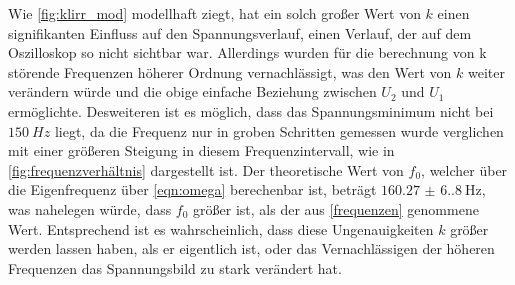     Wie \ref{fig:klirr_mod} modellhaft ziegt, hat ein solch großer Wert von $k$ einen signifikanten Einfluss auf den Spannungsverlauf, einen
    Verlauf, der auf dem Oszilloskop so nicht sichtbar war.
    Allerdings wurden für die berechnung von k störende Frequenzen höherer Ordnung vernachlässigt, was den Wert von $k$ weiter
    verändern würde und die obige einfache Beziehung zwischen $U_2$ und $U_1$ ermöglichte. Desweiteren ist es möglich, dass 
    das Spannungsminimum nicht bei $\qty{150}{Hz}$ liegt, da die Frequenz nur in groben Schritten gemessen wurde verglichen mit einer
    größeren Steigung in diesem Frequenzintervall, wie in \ref{fig:frequenzverhältnis} dargestellt ist. Der theoretische Wert von
    $f_0$, welcher über die Eigenfrequenz über \ref{eqn:omega} berechenbar ist, beträgt $\qty{160.27(6.80)}{\hertz}$, was nahelegen würde,
    dass $f_0$ größer ist, als der aus \ref{frequenzen} genommene Wert. Entsprechend ist es wahrscheinlich, dass diese Ungenauigkeiten $k$ größer
    werden lassen haben, als er eigentlich ist, oder das Vernachlässigen der höheren Frequenzen das Spannungsbild zu stark verändert hat.

    \label{sec:Diskussion}
